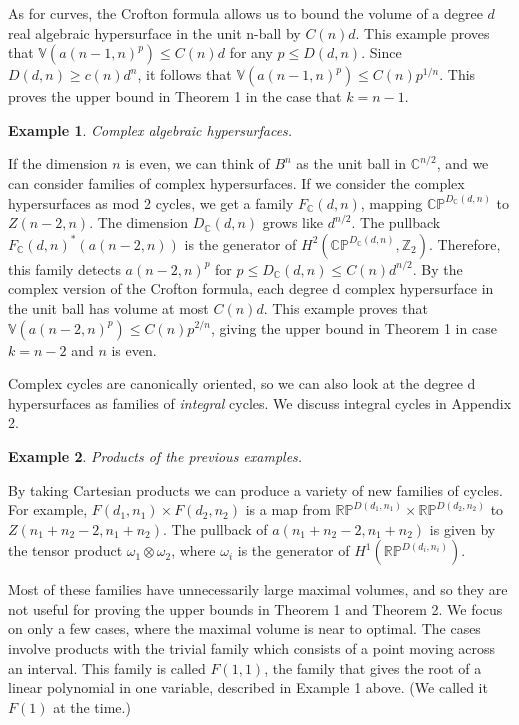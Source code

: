 \documentclass{amsart}
\newtheorem*{Theorem 1}{Theorem 1}
\newtheorem*{Theorem 2}{Theorem 2}
\newtheorem*{Theorem 1A}{Theorem 1A}
\newtheorem*{Theorem 2A}{Theorem 2A}
\newtheorem{example}{Example}
\newtheorem*{vanishing lemma}{Vanishing Lemma}
\numberwithin{equation}{section}
\begin{document}
As for curves, the Crofton formula allows us to bound the volume
of a degree $d$ real algebraic hypersurface in the unit n-ball by
$C(n) d$.  This example proves that $\mathbb{V}(a(n-1,n)^p) \le
C(n) d$ for any $p \le D(d,n)$.  Since $D(d,n) \ge c(n) d^n$, it
follows that $\mathbb{V}(a(n-1,n)^p) \le C(n) p^{1/n}$.  This
proves the upper bound in Theorem 1 in the case that $k = n-1$.

\begin{example} Complex algebraic hypersurfaces.
\end{example}

If the dimension $n$ is even, we can think of $B^n$ as the unit
ball in $\mathbb{C}^{n/2}$, and we can consider families of
complex hypersurfaces.  If we consider the complex hypersurfaces
as mod 2 cycles, we get a family $F_\mathbb{C}(d,n)$, mapping
$\mathbb{CP}^{D_\mathbb{C}(d,n)}$ to $Z(n-2,n)$.  The dimension
$D_\mathbb{C}(d,n)$ grows like $d^{n/2}$.  The pullback
$F_\mathbb{C}(d,n)^*(a(n-2,n))$ is the generator of
$H^2(\mathbb{CP}^{D_\mathbb{C}(d,n)}, \mathbb{Z}_2)$.  Therefore,
this family detects $a(n-2,n)^p$ for $p \le D_\mathbb{C}(d,n) \le
C(n) d^{n/2}$.  By the complex version of the Crofton formula,
each degree d complex hypersurface in the unit ball has volume at
most $C(n) d$.  This example proves that $\mathbb{V}(a(n-2,n)^p)
\le C(n) p^{2/n}$, giving the upper bound in Theorem 1 in case $k
= n-2$ and $n$ is even.

Complex cycles are canonically oriented, so we can also look at
the degree d hypersurfaces as families of {\it integral} cycles. 
We discuss integral cycles in Appendix 2.

\begin{example} Products of the previous examples.
\end{example}

By taking Cartesian products we can produce a variety of new
families of cycles.  For example, $F(d_1, n_1) \times F(d_2,
n_2)$ is a map from $\mathbb{RP}^{D(d_1,n_1)} \times
\mathbb{RP}^{D(d_2, n_2)}$ to $Z(n_1 + n_2 - 2, n_1 + n_2)$.  The
pullback of $a(n_1 + n_2 -2, n_1 + n_2)$ is given by the tensor
product $\omega_1 \otimes \omega_2$, where $\omega_i$ is the
generator of $H^1(\mathbb{RP}^{D(d_i,n_i)})$.  

Most of these families have unnecessarily large maximal volumes,
and so they are not useful for proving the upper bounds in
Theorem 1 and Theorem 2.  We focus on only a few cases, where the
maximal volume is near to optimal.  The cases involve products
with the trivial family which consists of a point moving across
an interval.  This family is called $F(1,1)$, the family that
gives the root of a linear polynomial in one variable, described
in Example 1 above.  (We called it $F(1)$ at the time.)
\end{document}
